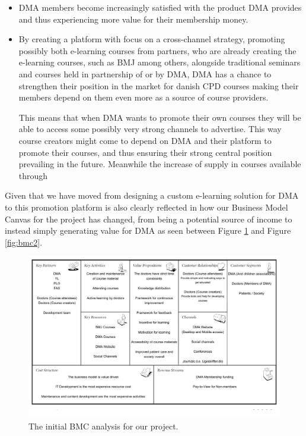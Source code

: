 \begin{itemize}
\item DMA members become increasingly satisfied with the product DMA provides and thus experiencing more value for their membership money. 
\item By creating a platform with focus on a cross-channel strategy, promoting possibly both e-learning courses from partners, who are already creating the e-learning courses, such as BMJ among others, alongside traditional seminars and courses held in partnership of or by DMA, DMA has a chance to strengthen their position in the market for danish CPD courses making their members depend on them even more as a source of course providers.

This means that when DMA wants to promote their own courses they will be able to access some possibly very strong channels to advertise. This way course creators might come to depend on DMA and their platform to promote their courses, and thus ensuring their strong central position prevailing in the future. Meanwhile the increase of supply in courses available through
\end{itemize}

Given that we have moved from designing a custom e-learning solution for DMA to this promotion platform is also clearly reflected in how our Business Model Canvas for the project has changed, from being a potential source of income to instead simply generating value for DMA as seen between Figure \ref{fig:bmc1} and Figure \ref{fig:bmc2}.


\begin{figure}[h!]
 \begin{center}
  \includegraphics[width=1\textwidth]{figures/Business-Model-Canvas-v1.pdf}
  \caption{The initial BMC analysis for our project.\label{fig:bmc1}}
 \end{center}
\end{figure}

